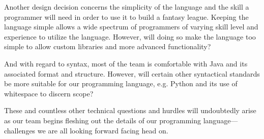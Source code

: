 \documentclass[12pt]{article}
\begin{document}
Another design decision concerns the simplicity of the language and the skill a programmer will need in order to use it to build a fantasy league. Keeping the language simple allows a wide spectrum of programmers of varying skill level and experience to utilize the language. However, will doing so make the language too simple to allow custom libraries and more advanced functionality?

And with regard to syntax, most of the team is comfortable with Java and its associated format and structure. However, will certain other syntactical standards be more suitable for our programming language, e.g. Python and its use of whitespace to discern scope?

These and countless other technical questions and hurdles will undoubtedly arise as our team begins fleshing out the details of our programming language---challenges we are all looking forward facing head on.
\end{document}
